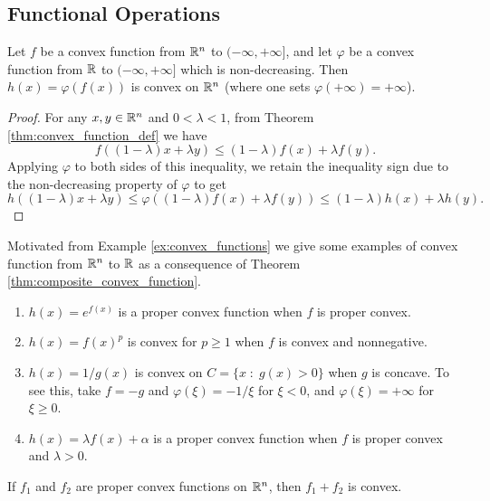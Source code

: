 \documentclass[11pt,a4paper]{article}
\begin{document}
\subsection{Functional Operations}

\begin{theorem}\label{thm:composite_convex_function}
    Let $f$ be a convex function from $\mathbb{R}^n$ to $(-\infty,+\infty]$, and let $\varphi$ be a convex function from $\mathbb{R}$ to $(-\infty,+\infty]$ which is non-decreasing. Then $h(x) = \varphi(f(x))$ is convex on $\mathbb{R}^n$ (where one sets $\varphi(+\infty) = +\infty$).
\end{theorem}

\begin{proof}
    For any $x,y\in \mathbb{R}^n$ and $0<\lambda<1$, from Theorem \ref{thm:convex_function_def} we have
    \begin{equation*}
        f((1-\lambda)x+\lambda y)\le (1-\lambda)f(x)+\lambda f(y).
    \end{equation*}
    Applying $\varphi$ to both sides of this inequality, we retain the inequality sign due to the non-decreasing property of $\varphi$ to get
    \begin{equation*}
        h((1-\lambda)x+\lambda y)\le \varphi((1-\lambda)f(x)+\lambda f(y)) \le (1-\lambda)h(x)+\lambda h(y).
    \end{equation*}
\end{proof}

\begin{example}
    Motivated from Example \ref{ex:convex_functions} we give some examples of convex function from $\mathbb{R}^n$ to $\mathbb{R}$ as a consequence of Theorem \ref{thm:composite_convex_function}.
    \begin{enumerate}
        \item $h(x) = e^{f(x)}$ is a proper convex function when $f$ is proper convex.
        \item $h(x) = f(x)^p$ is convex for $p\ge 1$ when $f$ is convex and nonnegative.
        \item $h(x) = 1/g(x)$ is convex on $C = \{x\;:\; g(x)>0\}$ when $g$ is concave. To see this, take $f = -g$ and $\varphi(\xi) = -1/\xi$ for $\xi<0$, and $\varphi(\xi)=+\infty$ for $\xi\ge 0$.
        \item $h(x) = \lambda f(x)+\alpha$ is a proper convex function when $f$ is proper convex and $\lambda>0$.
    \end{enumerate}
\end{example}

\begin{theorem}\label{thm:sum_of_convex_functions}
    If $f_1$ and $f_2$ are proper convex functions on $\mathbb{R}^n$, then $f_1+f_2$ is convex.
\end{theorem}
\end{document}
